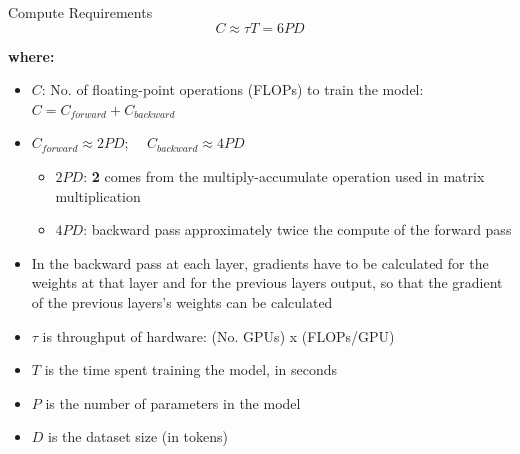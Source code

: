\begin{vbframe}{Compute Requirements $$C \approx \tau T = 6 P D$$ }

\textbf{where:}

\begin{itemize}
    \item $C$: No. of floating-point operations (FLOPs) to train the model:\\
          $C = C_{forward} + C_{backward}$
	\item $C_{forward} \approx 2 P D$; $\quad C_{backward} \approx 4 P D$
	\begin{itemize}
	    \item $2PD$: \textbf{2} comes from the multiply-accumulate operation used in matrix multiplication
        \item $4PD$: backward pass approximately twice the compute of the forward pass
	\end{itemize}
    \item In the backward pass at each layer, gradients have to be calculated for the weights at that layer and for the previous layers output, so that the gradient of the previous layers's weights can be calculated
	\item $\tau$ is throughput of hardware: (No. GPUs) x (FLOPs/GPU)
	\item $T$ is the time spent training the model, in seconds
	\item $P$ is the number of parameters in the model
	\item $D$ is the dataset size (in tokens)
\end{itemize}

\end{vbframe}


